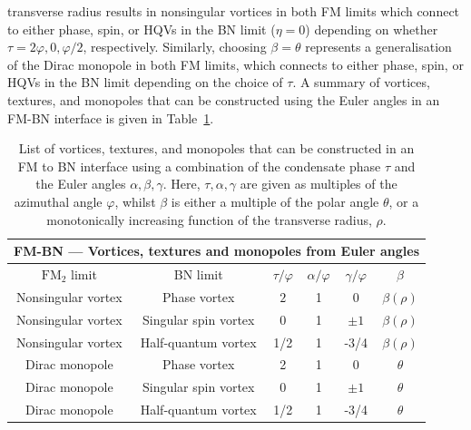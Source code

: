 transverse radius results in nonsingular vortices in both FM limits which
connect to either phase, spin, or HQVs in the BN limit (\(\eta=0\)) depending
on whether \(\tau=2\varphi, 0, \varphi/2\), respectively.
Similarly, choosing \(\beta=\theta\) represents a generalisation of the Dirac
monopole in both FM limits, which connects to either phase, spin, or HQVs in
the BN limit depending on the choice of \(\tau\).
A summary of vortices, textures, and monopoles that can be constructed using
the Euler angles in an FM-BN interface is given in Table~\ref{tab: FM-BN-other}.
\begin{table}
    \centering
    \begin{tabular}{cccccc}
        \toprule
        \multicolumn{6}{c}{FM-BN --- Vortices, textures and monopoles from Euler
            angles} \\
        \midrule
        \(\text{FM}_2\) limit & BN limit & \(\tau/\varphi\) & \(\alpha/\varphi\)
            & \(\gamma/\varphi\) & \(\beta\) \\
        \midrule
        Nonsingular vortex & Phase vortex & \(2\) & 1 & \(0\)
            & \(\beta(\rho)\) \\ 
        Nonsingular vortex & Singular spin vortex  & \(0\) & 1 & \(\pm 1\)
            & \(\beta(\rho)\) \\ 
        Nonsingular vortex & Half-quantum vortex & 1/2 & 1 & -3/4
            & \(\beta(\rho)\) \\ 
        Dirac monopole & Phase vortex & 2 & 1  & 0 & \(\theta\)\\
        Dirac monopole & Singular spin vortex & 0 & 1  & \(\pm 1\)
            & \(\theta\)\\
        Dirac monopole & Half-quantum vortex & 1/2 & 1  & -3/4 & \(\theta\) \\
        \bottomrule
    \end{tabular}
    \caption{\label{tab: FM-BN-other}List of vortices, textures, and monopoles
    that can be constructed in an FM to BN interface using a combination
    of the condensate phase \(\tau\) and the Euler angles \(\alpha, \beta,
    \gamma\).
    Here, \(\tau, \alpha, \gamma\) are given as multiples of the azimuthal angle
    \(\varphi\), whilst \(\beta\) is either a multiple of the polar angle
    \(\theta\), or a monotonically increasing function of the transverse radius,
    \(\rho\).}
\end{table}

